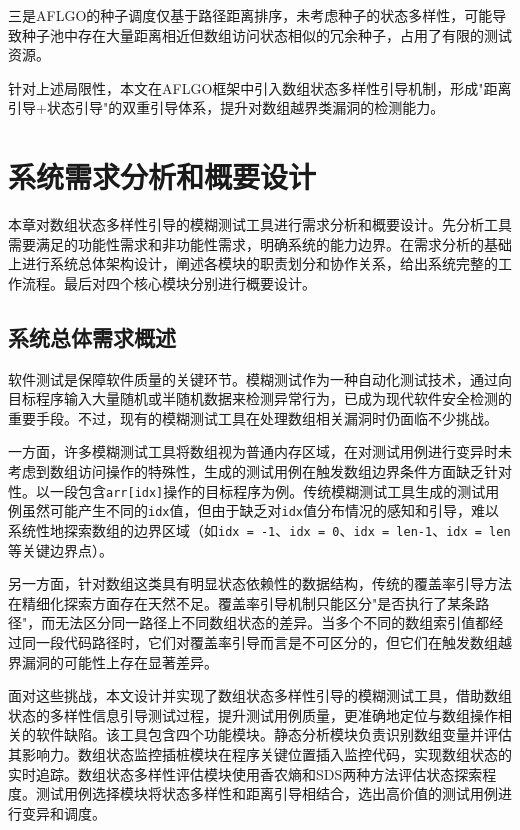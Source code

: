 \documentclass[bachelor]{njupthesis}
\begin{document}
三是AFLGO的种子调度仅基于路径距离排序，未考虑种子的状态多样性，可能导致种子池中存在大量距离相近但数组访问状态相似的冗余种子，占用了有限的测试资源。

针对上述局限性，本文在AFLGO框架中引入数组状态多样性引导机制，形成"距离引导+状态引导"的双重引导体系，提升对数组越界类漏洞的检测能力。


\chapter{系统需求分析和概要设计}

本章对数组状态多样性引导的模糊测试工具进行需求分析和概要设计。先分析工具需要满足的功能性需求和非功能性需求，明确系统的能力边界。在需求分析的基础上进行系统总体架构设计，阐述各模块的职责划分和协作关系，给出系统完整的工作流程。最后对四个核心模块分别进行概要设计。

\section{系统总体需求概述}

软件测试是保障软件质量的关键环节。模糊测试作为一种自动化测试技术，通过向目标程序输入大量随机或半随机数据来检测异常行为，已成为现代软件安全检测的重要手段。不过，现有的模糊测试工具在处理数组相关漏洞时仍面临不少挑战。

一方面，许多模糊测试工具将数组视为普通内存区域，在对测试用例进行变异时未考虑到数组访问操作的特殊性，生成的测试用例在触发数组边界条件方面缺乏针对性。以一段包含\texttt{arr[idx]}操作的目标程序为例。传统模糊测试工具生成的测试用例虽然可能产生不同的\texttt{idx}值，但由于缺乏对\texttt{idx}值分布情况的感知和引导，难以系统性地探索数组的边界区域（如\texttt{idx = -1}、\texttt{idx = 0}、\texttt{idx = len-1}、\texttt{idx = len}等关键边界点）。

另一方面，针对数组这类具有明显状态依赖性的数据结构，传统的覆盖率引导方法在精细化探索方面存在天然不足。覆盖率引导机制只能区分"是否执行了某条路径"，而无法区分同一路径上不同数组状态的差异。当多个不同的数组索引值都经过同一段代码路径时，它们对覆盖率引导而言是不可区分的，但它们在触发数组越界漏洞的可能性上存在显著差异。

面对这些挑战，本文设计并实现了数组状态多样性引导的模糊测试工具，借助数组状态的多样性信息引导测试过程，提升测试用例质量，更准确地定位与数组操作相关的软件缺陷。该工具包含四个功能模块。静态分析模块负责识别数组变量并评估其影响力。数组状态监控插桩模块在程序关键位置插入监控代码，实现数组状态的实时追踪。数组状态多样性评估模块使用香农熵和SDS两种方法评估状态探索程度。测试用例选择模块将状态多样性和距离引导相结合，选出高价值的测试用例进行变异和调度。
\end{document}
